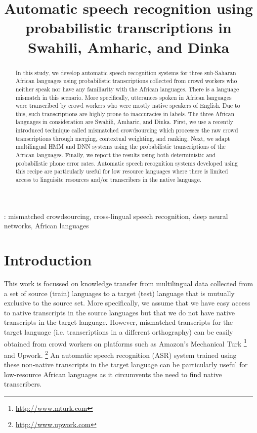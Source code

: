 \documentclass[a4paper]{article}
\title{Automatic speech recognition using probabilistic transcriptions in Swahili, Amharic, and Dinka}
\newcommand{\myvspacesec}{\vspace{-2mm}}
\begin{document}
\maketitle
\begin{abstract}
In this study, we develop automatic speech recognition systems for three sub-Saharan African languages
using probabilistic transcriptions collected from crowd workers who neither speak nor have any familiarity 
with the African languages. There is a language mismatch in this scenario. More specifically, utterances spoken in African languages were transcribed by crowd workers who were mostly native speakers of English. Due to this, such transcriptions are highly prone to inaccuracies in labels. The three African languages in consideration are Swahili, Amharic, and Dinka. First, we use a recently introduced technique called mismatched crowdsourcing which processes the raw crowd transcriptions through merging, contextual weighting, and ranking. Next, we  adapt multilingual HMM and DNN systems using the probabilistic transcriptions of the African languages.  Finally, we report the results using both deterministic and probabilistic phone error rates. Automatic speech recognition systems developed using this recipe are particularly useful for low resource languages where there is limited access to linguisitc resources and/or transcribers in the native language.
\end{abstract}
%
: mismatched crowdsourcing, cross-lingual speech recognition, deep neural networks,
African languages
\vspace{-3mm}
%
\myvspacesec
\section{Introduction}  \vspace{-2mm}
\label{sec:Introduction}
This work is focussed on knowledge transfer from multilingual data collected from a set of source (train) languages to a target (test) language that is mutually exclusive to the source set. More specifically, we assume that we have easy access to native transcripts in the source languages but that we do not have native transcripts in the target language. However, mismatched transcripts for the target language (i.e. transcriptions in a different orthography) can be easily obtained from crowd workers on platforms such as Amazon's Mechanical Turk%
\footnote{\url{http://www.mturk.com}}
%
and Upwork.%
\footnote{\url{http://www.upwork.com}}
%
An automatic speech recognition (ASR) system trained using these non-native transcripts in the target language can be particularly useful for low-resource African languages as it circumvents the need to find native transcribers. 
\end{document}
